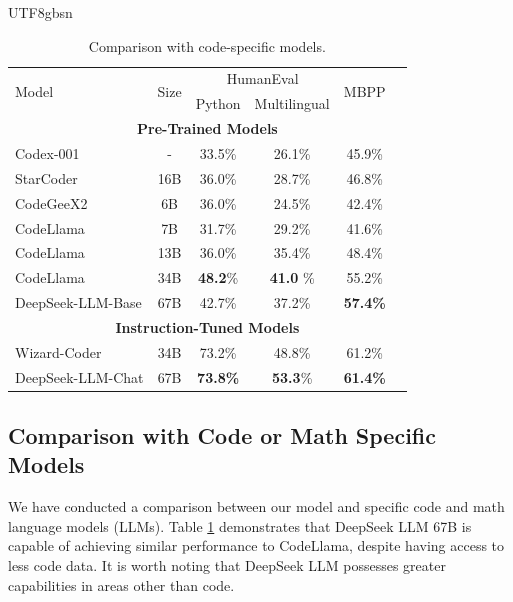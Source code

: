 \documentclass[11pt, a4paper, logo, copyright, nonumbering]{deepseek}
\begin{document}
\begin{CJK*}{UTF8}{gbsn}
\begin{table}[h]
	
		\centering
        \small
        
		\begin{tabular}{lccccc}
			\toprule
                 \multirow{2}{*}{Model} & \multirow{2}{*}{Size} & \multicolumn{2}{c}{HumanEval} & \multirow{2}{*}{MBPP} \\
                 
                  & & Python & Multilingual & & \\
            \midrule
            \multicolumn{6}{c}{\bf{Pre-Trained Models}} \\
            \midrule
            Codex-001 & - & 33.5\% & 26.1\% & 45.9\%  \\
            StarCoder & 16B & 36.0\% & 28.7\% & 46.8\% \\
            CodeGeeX2 & 6B & 36.0\% & 24.5\% & 42.4\%  \\
            CodeLlama & 7B & 31.7\% & 29.2\% & 41.6\% \\
            CodeLlama & 13B & 36.0\% & 35.4\% & 48.4\%  \\
            CodeLlama & 34B & \textbf{48.2}\% & \textbf{41.0} \% & 55.2\% \\
           
            DeepSeek-LLM-Base & 67B & 42.7\% & 37.2\% & \textbf{57.4\%}  \\
            \midrule
            \multicolumn{6}{c}{\bf{Instruction-Tuned Models}} \\
            \midrule
            Wizard-Coder & 34B & 73.2\% & 48.8\% & 61.2\% \\
            DeepSeek-LLM-Chat & 67B & \textbf{73.8\%} & \textbf{53.3}\% & \textbf{61.4\%} &\\
		\bottomrule
		\end{tabular}
    
        	\caption{\centering Comparison with code-specific models. \label{table:compare-code}}
\end{table}

\subsection{Comparison with Code or Math Specific Models}
\label{sec:code-and-math}

We have conducted a comparison between our model and specific code and math language models (LLMs). Table \ref{table:compare-code} demonstrates that DeepSeek LLM 67B is capable of achieving similar performance to CodeLlama, despite having access to less code data. It is worth noting that DeepSeek LLM possesses greater capabilities in areas other than code. 


\end{CJK*}
\end{document}
